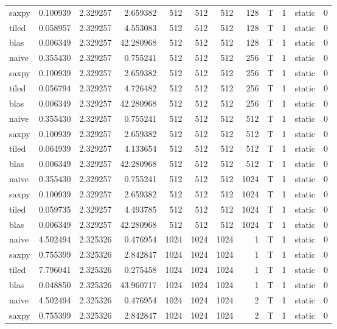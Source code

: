 \documentclass[
  12pt,
  xcolor = usenames,dvipsnames]{article}
\begin{document}
\begin{table}[!h]
{\begin{tabular}[t]{lrrrrrrrlrlr}
saxpy & 0.100939 & 2.329257 & 2.659382 & 512 & 512 & 512 & 128 & T & 1 & static & 0\\
tiled & 0.058957 & 2.329257 & 4.553083 & 512 & 512 & 512 & 128 & T & 1 & static & 0\\
blas & 0.006349 & 2.329257 & 42.280968 & 512 & 512 & 512 & 128 & T & 1 & static & 0\\
naive & 0.355430 & 2.329257 & 0.755241 & 512 & 512 & 512 & 256 & T & 1 & static & 0\\
\addlinespace
saxpy & 0.100939 & 2.329257 & 2.659382 & 512 & 512 & 512 & 256 & T & 1 & static & 0\\
tiled & 0.056794 & 2.329257 & 4.726482 & 512 & 512 & 512 & 256 & T & 1 & static & 0\\
blas & 0.006349 & 2.329257 & 42.280968 & 512 & 512 & 512 & 256 & T & 1 & static & 0\\
naive & 0.355430 & 2.329257 & 0.755241 & 512 & 512 & 512 & 512 & T & 1 & static & 0\\
saxpy & 0.100939 & 2.329257 & 2.659382 & 512 & 512 & 512 & 512 & T & 1 & static & 0\\
\addlinespace
tiled & 0.064939 & 2.329257 & 4.133654 & 512 & 512 & 512 & 512 & T & 1 & static & 0\\
blas & 0.006349 & 2.329257 & 42.280968 & 512 & 512 & 512 & 512 & T & 1 & static & 0\\
naive & 0.355430 & 2.329257 & 0.755241 & 512 & 512 & 512 & 1024 & T & 1 & static & 0\\
saxpy & 0.100939 & 2.329257 & 2.659382 & 512 & 512 & 512 & 1024 & T & 1 & static & 0\\
tiled & 0.059735 & 2.329257 & 4.493785 & 512 & 512 & 512 & 1024 & T & 1 & static & 0\\
\addlinespace
blas & 0.006349 & 2.329257 & 42.280968 & 512 & 512 & 512 & 1024 & T & 1 & static & 0\\
naive & 4.502494 & 2.325326 & 0.476954 & 1024 & 1024 & 1024 & 1 & T & 1 & static & 0\\
saxpy & 0.755399 & 2.325326 & 2.842847 & 1024 & 1024 & 1024 & 1 & T & 1 & static & 0\\
tiled & 7.796041 & 2.325326 & 0.275458 & 1024 & 1024 & 1024 & 1 & T & 1 & static & 0\\
blas & 0.048850 & 2.325326 & 43.960717 & 1024 & 1024 & 1024 & 1 & T & 1 & static & 0\\
\addlinespace
naive & 4.502494 & 2.325326 & 0.476954 & 1024 & 1024 & 1024 & 2 & T & 1 & static & 0\\
saxpy & 0.755399 & 2.325326 & 2.842847 & 1024 & 1024 & 1024 & 2 & T & 1 & static & 0\\

\end{tabular}}
\end{table}
\end{document}
